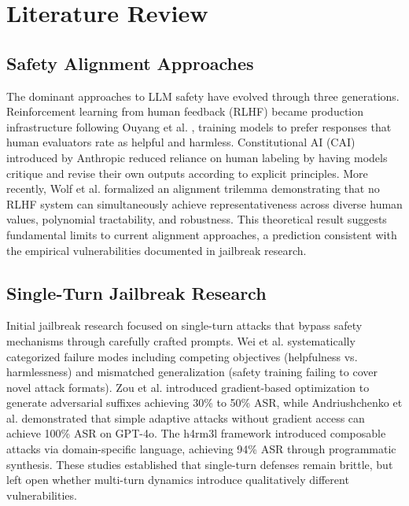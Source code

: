 \documentclass[11pt,a4paper]{article}
\begin{document}
\section{Literature Review}

\subsection{Safety Alignment Approaches}

The dominant approaches to LLM safety have evolved through three generations. Reinforcement learning from human feedback (RLHF) became production infrastructure following Ouyang et al. \cite{ouyang2022training}, training models to prefer responses that human evaluators rate as helpful and harmless. Constitutional AI (CAI) introduced by Anthropic \cite{bai2022constitutional} reduced reliance on human labeling by having models critique and revise their own outputs according to explicit principles. More recently, Wolf et al. \cite{wolf2025trilemma} formalized an alignment trilemma demonstrating that no RLHF system can simultaneously achieve representativeness across diverse human values, polynomial tractability, and robustness. This theoretical result suggests fundamental limits to current alignment approaches, a prediction consistent with the empirical vulnerabilities documented in jailbreak research.

\subsection{Single-Turn Jailbreak Research}

Initial jailbreak research focused on single-turn attacks that bypass safety mechanisms through carefully crafted prompts. Wei et al. \cite{wei2023jailbroken} systematically categorized failure modes including competing objectives (helpfulness vs. harmlessness) and mismatched generalization (safety training failing to cover novel attack formats). Zou et al. \cite{zou2023universal} introduced gradient-based optimization to generate adversarial suffixes achieving 30\% to 50\% ASR, while Andriushchenko et al. \cite{andriushchenko2024jailbreaking} demonstrated that simple adaptive attacks without gradient access can achieve 100\% ASR on GPT-4o. The h4rm3l framework \cite{souly2024h4rm3l} introduced composable attacks via domain-specific language, achieving 94\% ASR through programmatic synthesis. These studies established that single-turn defenses remain brittle, but left open whether multi-turn dynamics introduce qualitatively different vulnerabilities.
\end{document}
